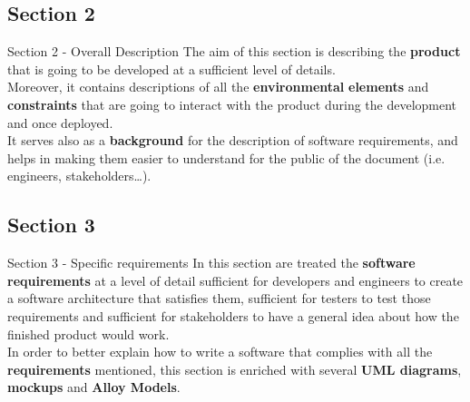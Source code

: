 \documentclass{../common/latex_classes/pdf_presentation}
\begin{document}
	\subsection{Section 2}
	
	\begin{frame}{Section 2 - Overall Description}
		The aim of this section is describing the \textbf{product} that is going to be developed at a sufficient level of details.\\
		Moreover, it contains descriptions of all the \textbf{environmental} \textbf{elements} and \textbf{constraints} that are going to interact with the product during the development and once deployed.\\
		It serves also as a \textbf{background} for the description of software requirements, and helps in making them easier to understand for the public of the document (i.e. engineers, stakeholders…).
	\end{frame}
	
	\subsection{Section 3}
	
	\begin{frame}{Section 3 - Specific requirements}
		In this section are treated the \textbf{software requirements} at a level of detail sufficient for developers and engineers to create a software architecture that satisfies them, sufficient for testers to test those requirements and sufficient for stakeholders to have a general idea about how the finished product would work.\\
		In order to better explain how to write a software that complies with all the \textbf{requirements} mentioned, this section is enriched with several \textbf{UML diagrams}, \textbf{mockups} and \textbf{Alloy Models}. 
	\end{frame}
	
\end{document}
